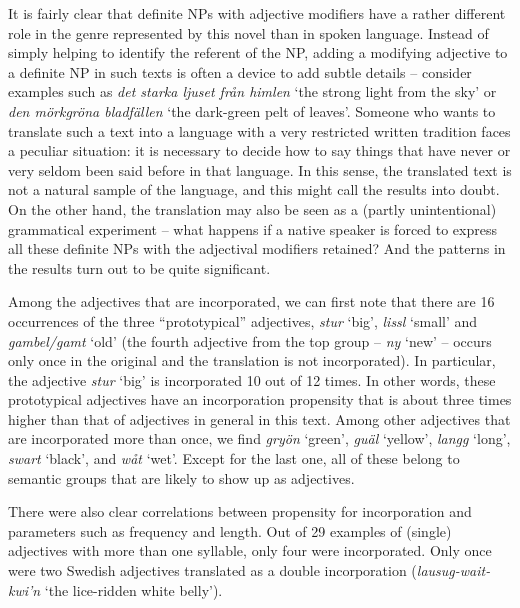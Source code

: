 \begin{styleBodytextC}
It is fairly clear that definite NPs with adjective modifiers have a rather different role in the genre represented by this novel than in spoken language. Instead of simply helping to identify the referent of the NP, adding a modifying adjective to a definite NP in such texts is often a device to add subtle details – consider examples such as \textit{det starka ljuset från himlen} ‘the strong light from the sky’ or \textit{den mörkgröna bladfällen} ‘the dark-green pelt of leaves’. Someone who wants to translate such a text into a language with a very restricted written tradition faces a peculiar situation: it is necessary to decide how to say things that have never or very seldom been said before in that language. In this sense, the translated text is not a natural sample of the language, and this might call the results into doubt. On the other hand, the translation may also be seen as a (partly unintentional) grammatical experiment – what happens if a native speaker is forced to express all these definite NPs with the adjectival modifiers retained? And the patterns in the results turn out to be quite significant.

\end{styleBodytextC}

\begin{styleBodytextC}
Among the adjectives that are incorporated, we can first note that there are 16 occurrences of the three “prototypical” adjectives, \textit{stur} ‘big’, \textit{lissl} ‘small’ and \textit{gambel/gamt }‘old’ (the fourth adjective from the top group – \textit{ny} ‘new’ – occurs only once in the original and the translation is not incorporated). In particular, the adjective \textit{stur} ‘big’ is incorporated 10 out of 12 times. In other words, these prototypical adjectives have an incorporation propensity that is about three times higher than that of adjectives in general in this text. Among other adjectives that are incorporated more than once, we find \textit{gryön} ‘green’, \textit{guäl} ‘yellow’, \textit{langg} ‘long’, \textit{swart} ‘black’, and \textit{wåt} ‘wet’. Except for the last one, all of these belong to semantic groups that are likely to show up as adjectives.

\end{styleBodytextC}

\begin{styleBodytextC}
There were also clear correlations between propensity for incorporation and parameters such as frequency and length. Out of 29 examples of (single) adjectives with more than one syllable, only four were incorporated. Only once were two Swedish adjectives translated as a double incorporation (\textit{lausug-wait-kwi’n} ‘the lice-ridden white belly’).

\end{styleBodytextC}

